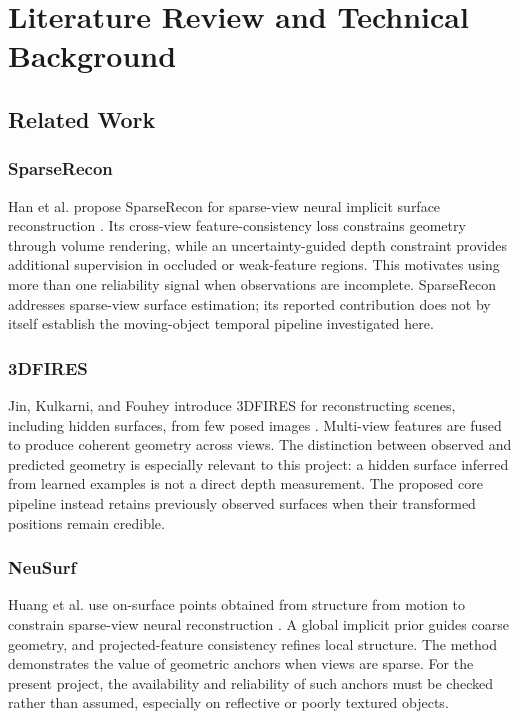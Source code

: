 \chapter{Literature Review and Technical Background}
\section{Related Work}
\subsection{SparseRecon}
Han et al. propose SparseRecon for sparse-view neural implicit surface reconstruction \cite{sparserecon}. Its cross-view feature-consistency loss constrains geometry through volume rendering, while an uncertainty-guided depth constraint provides additional supervision in occluded or weak-feature regions. This motivates using more than one reliability signal when observations are incomplete. SparseRecon addresses sparse-view surface estimation; its reported contribution does not by itself establish the moving-object temporal pipeline investigated here.

\subsection{3DFIRES}
Jin, Kulkarni, and Fouhey introduce 3DFIRES for reconstructing scenes, including hidden surfaces, from few posed images \cite{fires}. Multi-view features are fused to produce coherent geometry across views. The distinction between observed and predicted geometry is especially relevant to this project: a hidden surface inferred from learned examples is not a direct depth measurement. The proposed core pipeline instead retains previously observed surfaces when their transformed positions remain credible.

\subsection{NeuSurf}
Huang et al. use on-surface points obtained from structure from motion to constrain sparse-view neural reconstruction \cite{neusurf}. A global implicit prior guides coarse geometry, and projected-feature consistency refines local structure. The method demonstrates the value of geometric anchors when views are sparse. For the present project, the availability and reliability of such anchors must be checked rather than assumed, especially on reflective or poorly textured objects.

